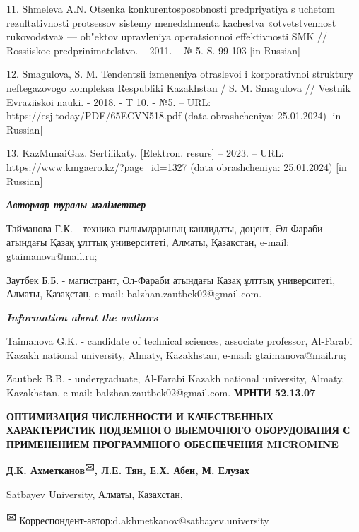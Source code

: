 11. Shmeleva A.N. Otsenka konkurentosposobnosti predpriyatiya s uchetom
rezul\textquotesingle tativnosti protsessov sistemy menedzhmenta
kachestva «otvetstvennost\textquotesingle{} rukovodstva» --- ob"ektov
upravleniya operatsionnoi effektivnosti SMK // Rossiiskoe
predprinimatel\textquotesingle stvo. -- 2011. -- № 5. S. 99-103 {[}in
Russian{]}

12. Smagulova, S. M. Tendentsii izmeneniya otraslevoi i korporativnoi
struktury neftegazovogo kompleksa Respubliki Kazakhstan / S. M.
Smagulova // Vestnik Evraziiskoi nauki. - 2018. - T 10. - №5. -- URL:
https://esj.today/PDF/65ECVN518.pdf (data obrashcheniya: 25.01.2024)
{[}in Russian{]}

13. KazMunaiGaz. Sertifikaty. {[}Elektron. resurs{]} -- 2023. -- URL:
https://www.kmgaero.kz/?page\_id=1327 (data obrashcheniya: 25.01.2024)
{[}in Russian{]}

\emph{{\bfseries Авторлар туралы мәліметтер}}

Тайманова Г.К. - техника ғылымдарының кандидаты, доцент, Әл-Фараби
атындағы Қазақ ұлттық университеті, Алматы, Қазақстан, e-mail:
gtaimanova@mail.ru;

Заутбек Б.Б. - магистрант, Әл-Фараби атындағы Қазақ ұлттық университеті,
Алматы, Қазақстан, e-mail: balzhan.zautbek02@gmail.com.

\emph{{\bfseries Information about the authors}}

Taimanova G.K. - candidate of technical sciences, associate professor,
Al-Farabi Kazakh national university, Almaty, Kazakhstan, e-mail:
gtaimanova@mail.ru;

Zautbek B.B. - undergraduate, Al-Farabi Kazakh national university,
Almaty, Kazakhstan, e-mail: balzhan.zautbek02@gmail.com.\newpage
{\bfseries МРНТИ 52.13.07}

{\bfseries ОПТИМИЗАЦИЯ ЧИСЛЕННОСТИ И КАЧЕСТВЕННЫХ ХАРАКТЕРИСТИК ПОДЗЕМНОГО
ВЫЕМОЧНОГО ОБОРУДОВАНИЯ С ПРИМЕНЕНИЕМ ПРОГРАММНОГО ОБЕСПЕЧЕНИЯ
MICROMINE}

{\bfseries Д.К. Ахметканов\textsuperscript{🖂}, Л.Е. Тян, Е.Х. Абен, М.
Елузах}

Satbayev University, Алматы, Казахстан,

{\bfseries \textsuperscript{🖂}}
Корреспондент-автор:d.akhmetkanov@satbayev.university

